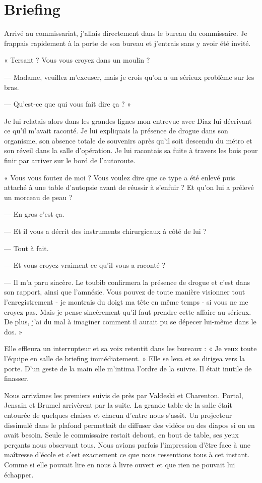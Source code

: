 \chapter{Briefing}

Arrivé au commissariat, j'allais directement dans le bureau du commissaire. Je frappais rapidement à la porte de son
bureau et j'entrais sans y avoir été invité.

« Tersant ? Vous vous croyez dans un moulin ?

— Madame, veuillez m'excuser, mais je crois qu'on a un sérieux problème sur les bras.

— Qu'est-ce que qui vous fait dire ça ? »

Je lui relatais alors dans les grandes lignes mon  entrevue avec Diaz lui décrivant ce qu'il m'avait raconté. Je lui
expliquais la présence de drogue dans son organisme, son absence totale de souvenirs après qu'il soit descendu du
métro et son réveil dans la salle d'opération. Je lui racontais sa fuite à travers les bois pour finir par arriver 
sur le bord de l'autoroute.

« Vous vous foutez de moi ? Vous voulez dire que ce type a été enlevé puis attaché à une table d'autopsie avant de
réussir à s'enfuir ? Et qu'on lui a prélevé un morceau de peau ?

— En gros c'est ça.

— Et il vous a décrit des instruments chirurgicaux à côté de lui ?

— Tout à fait.

— Et vous croyez vraiment ce qu'il vous a raconté ?

— Il m'a paru sincère. Le toubib confirmera la présence de drogue et c'est dans son rapport, ainsi que l'amnésie. Vous
pouvez de toute manière visionner tout l'enregistrement - je montrais du doigt ma tête en même temps - si vous ne me
croyez pas. Mais je pense sincèrement qu'il faut prendre cette affaire au sérieux. De plus, j'ai du mal à imaginer 
comment il aurait pu se dépecer lui-même dans le dos. »

Elle effleura un interrupteur et sa voix retentit dans les bureaux : « Je veux toute l'équipe en salle de briefing
immédiatement. » Elle se leva et se dirigea vers la porte. D'un geste de la main elle m'intima l'ordre de la suivre. Il
était inutile de finasser. 

Nous arrivâmes les premiers suivis de près par Valdeski et Charenton. Portal, Jensain et Brumel arrivèrent par la 
suite. La grande table de la salle était entourée de quelques chaises et chacun d'entre nous s'assit. Un projecteur 
dissimulé  dans le plafond permettait de diffuser des vidéos ou des diapos si on en avait besoin. Seule le commissaire 
restait debout, en bout de table, ses yeux perçants nous observant tous. Nous avions parfois l'impression d'être face à 
une maîtresse d'école et c'est exactement ce que nous ressentions tous à cet instant. Comme si elle pouvait lire en nous 
à livre ouvert et que rien ne pouvait lui échapper.

